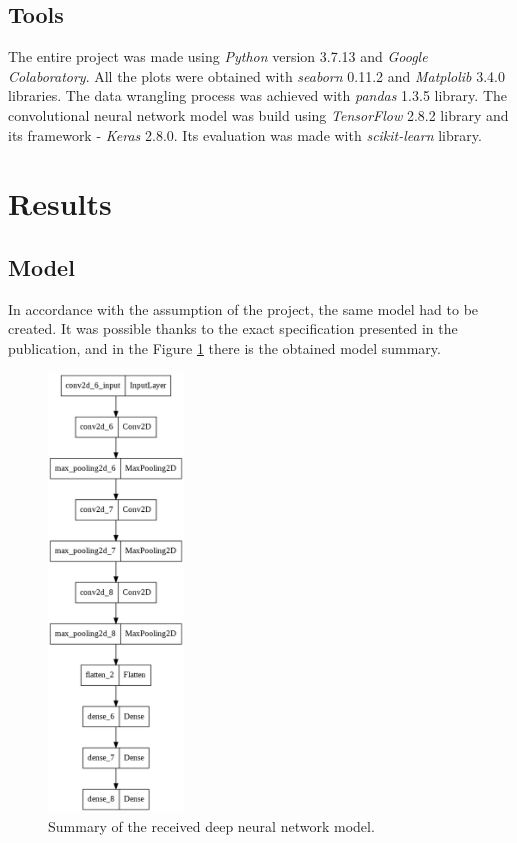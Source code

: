 \documentclass[12pt]{article}
\begin{document}
\subsection{Tools}
The entire project was made using \textit{Python} version 3.7.13 and \textit{Google Colaboratory}. All the plots were obtained with \textit{seaborn} 0.11.2 and \textit{Matplolib} 3.4.0 libraries. The data wrangling process was achieved with \textit{pandas} 1.3.5 library. The convolutional neural network model was build using \textit{TensorFlow} 2.8.2 library and its framework - \textit{Keras} 2.8.0. Its evaluation was made with \textit{scikit-learn} library.



\section{Results}
\subsection{Model}
In accordance with the assumption of the project, the same model had to be created. It was possible thanks to the exact specification presented in the publication\cite{1}, and in the Figure \ref{fig:model_sum} there is the obtained model summary.

\begin{figure}[!ht]
\centering
\includegraphics[width=0.32\textwidth]{model_sum.png}
\caption{\label{fig:model_sum}Summary of the received deep neural network model.}
\end{figure}
\end{document}
